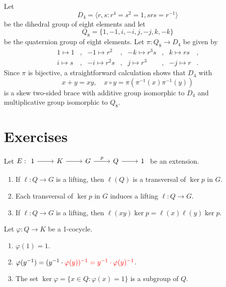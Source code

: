 
\begin{example}
	\label{exa:d8q8}
	Let 
	\[
	D_4=\langle r,s:r^4=s^2=1,srs=r^{-1}\rangle
	\]
	be the dihedral group of eight elements and let
	\[
	Q_8=\{1,-1,i,-i,j,-j,k,-k\}
	\]
	be the quaternion group of eight elements.  Let
	$\pi:Q_8\to D_4$ be given by 
	\begin{align*}
		1\mapsto 1 &, & -1\mapsto r^2 &,  & -k\mapsto r^3s &,&  k\mapsto rs &,\\
		i\mapsto s &, & -i\mapsto r^2s &, &  j\mapsto r^3 &, & -j\mapsto r &.
	\end{align*}
	Since $\pi$ is bijective, 
	a straightforward calculation shows that $D_4$ with 
	\[
	  x+y=xy,\quad 
	  x\circ y=\pi(\pi^{-1}(x)\pi^{-1}(y))
	\]
	is a skew two-sided brace with additive group isomorphic to $D_4$ and multiplicative group
	isomorphic to $Q_8$. 
\end{example}

\section*{Exercises}

\begin{prob}
	\label{xca:lifting}
	Let $E:
	\begin{tikzcd}
	1 & K & G & Q & 1
	\arrow[from=1-1, to=1-2]
	\arrow[from=1-2, to=1-3]
	\arrow["p", from=1-3, to=1-4]
	\arrow[from=1-4, to=1-5]
    \end{tikzcd}$
	be an extension. 
	\begin{enumerate}
		\item If $\ell\colon Q\to G$ is a lifting, then $\ell(Q)$
			is a transversal of $\ker p$ in $G$.
		\item Each transversal of $\ker p$ in $G$ induces a lifting $\ell\colon
			Q\to G$.
		\item If $\ell\colon Q\to G$ is a lifting, then 
			$\ell(xy)\ker p=\ell(x)\ell(y)\ker p$.
	\end{enumerate}
\end{prob}

\begin{prob}
	\label{xca:1cocycle}
	Let $\varphi\colon Q\to K$ be a 1-cocycle. 
	\begin{enumerate}
		\item $\varphi(1)=1$.
		\item $\varphi(y^{-1})=(y^{-1}\cdot\textcolor{red}{\varphi(y))^{-1}=y^{-1}\cdot\varphi(y)^{-1}}$.
		\item The set $\ker\varphi=\{x\in Q:\varphi(x)=1\}$ is a subgroup of $Q$. 
	\end{enumerate}
\end{prob}

